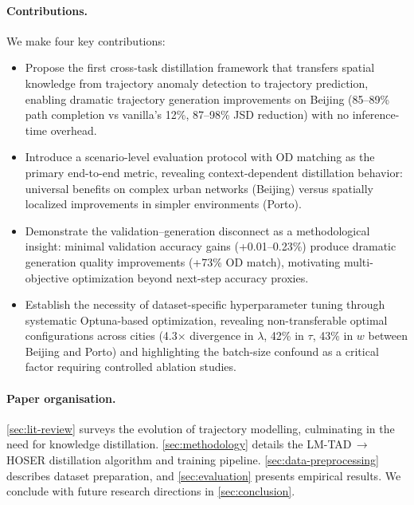 \paragraph{Contributions.}  We make four key contributions:
\begin{itemize}
  \item Propose the first cross-task distillation framework that transfers spatial knowledge from trajectory anomaly detection to trajectory prediction, enabling dramatic trajectory generation improvements on Beijing (85--89\% path completion vs vanilla's 12\%, 87--98\% JSD reduction) with no inference-time overhead.
  \item Introduce a scenario-level evaluation protocol with OD matching as the primary end-to-end metric, revealing context-dependent distillation behavior: universal benefits on complex urban networks (Beijing) versus spatially localized improvements in simpler environments (Porto).
  \item Demonstrate the validation--generation disconnect as a methodological insight: minimal validation accuracy gains (+0.01--0.23\%) produce dramatic generation quality improvements (+73\% OD match), motivating multi-objective optimization beyond next-step accuracy proxies.
  \item Establish the necessity of dataset-specific hyperparameter tuning through systematic Optuna-based optimization, revealing non-transferable optimal configurations across cities (4.3$\times$ divergence in $\lambda$, 42\% in $\tau$, 43\% in $w$ between Beijing and Porto) and highlighting the batch-size confound as a critical factor requiring controlled ablation studies.
\end{itemize}

\paragraph{Paper organisation.}  \autoref{sec:lit-review} surveys the evolution of trajectory modelling, culminating in the need for knowledge distillation.  \autoref{sec:methodology} details the LM-TAD\,$\rightarrow$\,HOSER distillation algorithm and training pipeline.  \autoref{sec:data-preprocessing} describes dataset preparation, and \autoref{sec:evaluation} presents empirical results.  We conclude with future research directions in \autoref{sec:conclusion}.

